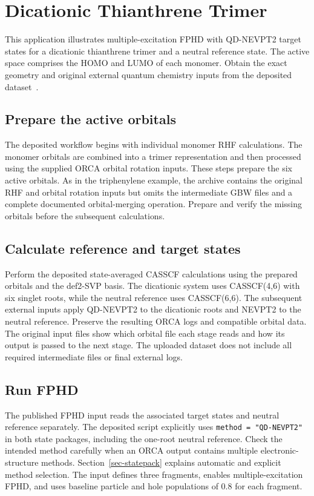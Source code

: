 \section{Dicationic Thianthrene Trimer}\label{sec-tut-dicationic}
This application illustrates multiple-excitation FPHD with QD-NEVPT2 target states for a dicationic thianthrene trimer and a neutral reference state. The active space comprises the HOMO and LUMO of each monomer. Obtain the exact geometry and original external quantum chemistry inputs from the deposited dataset~\cite{DiabatPaperData2026}.

\subsection{Prepare the active orbitals}
The deposited workflow begins with individual monomer RHF calculations. The monomer orbitals are combined into a trimer representation and then processed using the supplied ORCA orbital rotation inputs. These steps prepare the six active orbitals. As in the triphenylene example, the archive contains the original RHF and orbital rotation inputs but omits the intermediate GBW files and a complete documented orbital-merging operation. Prepare and verify the missing orbitals before the subsequent calculations.

\subsection{Calculate reference and target states}
Perform the deposited state-averaged CASSCF calculations using the prepared orbitals and the def2-SVP basis. The dicationic system uses CASSCF(4,6) with six singlet roots, while the neutral reference uses CASSCF(6,6). The subsequent external inputs apply QD-NEVPT2 to the dicationic roots and NEVPT2 to the neutral reference. Preserve the resulting ORCA logs and compatible orbital data. The original input files show which orbital file each stage reads and how its output is passed to the next stage. The uploaded dataset does not include all required intermediate files or final external logs.

\subsection{Run FPHD}
The published FPHD input reads the associated target states and neutral reference separately. The deposited script explicitly uses \texttt{method = "QD-NEVPT2"} in both state packages, including the one-root neutral reference.
Check the intended method carefully when an ORCA output contains multiple electronic-structure methods. Section~\ref{sec-statepack} explains automatic and explicit method selection. The input defines three fragments, enables multiple-excitation FPHD, and uses baseline particle and hole populations of 0.8 for each fragment.

